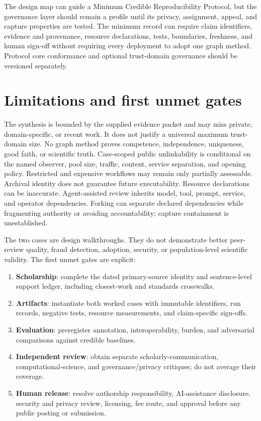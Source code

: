 \documentclass[11pt]{article}
\begin{document}
The design map can guide a Minimum Credible Reproducibility Protocol, but the governance layer should remain a profile until its privacy, assignment, appeal, and capture properties are tested. The minimum record can require claim identifiers, evidence and provenance, resource declarations, tests, boundaries, freshness, and human sign-off without requiring every deployment to adopt one graph method. Protocol core conformance and optional trust-domain governance should be versioned separately.

\section{Limitations and first unmet gates}
\label{sec:limitations}

The synthesis is bounded by the supplied evidence packet and may miss private, domain-specific, or recent work. It does not justify a universal maximum trust-domain size. No graph method proves competence, independence, uniqueness, good faith, or scientific truth. Case-scoped public unlinkability is conditional on the named observer, pool size, traffic, content, service separation, and opening policy. Restricted and expensive workflows may remain only partially assessable. Archival identity does not guarantee future executability. Resource declarations can be inaccurate. Agent-assisted review inherits model, tool, prompt, service, and operator dependencies. Forking can separate declared dependencies while fragmenting authority or avoiding accountability; capture containment is unestablished.

The two cases are design walkthroughs. They do not demonstrate better peer-review quality, fraud detection, adoption, security, or population-level scientific validity. The first unmet gates are explicit:

\begin{enumerate}
  \item \textbf{Scholarship}: complete the dated primary-source identity and sentence-level support ledger, including closest-work and standards crosswalks.
  \item \textbf{Artifacts}: instantiate both worked cases with immutable identifiers, run records, negative tests, resource measurements, and claim-specific sign-offs.
  \item \textbf{Evaluation}: preregister annotation, interoperability, burden, and adversarial comparisons against credible baselines.
  \item \textbf{Independent review}: obtain separate scholarly-communication, computational-science, and governance/privacy critiques; do not average their coverage.
  \item \textbf{Human release}: resolve authorship responsibility, AI-assistance disclosure, security and privacy review, licensing, fee route, and approval before any public posting or submission.
\end{enumerate}
\end{document}

